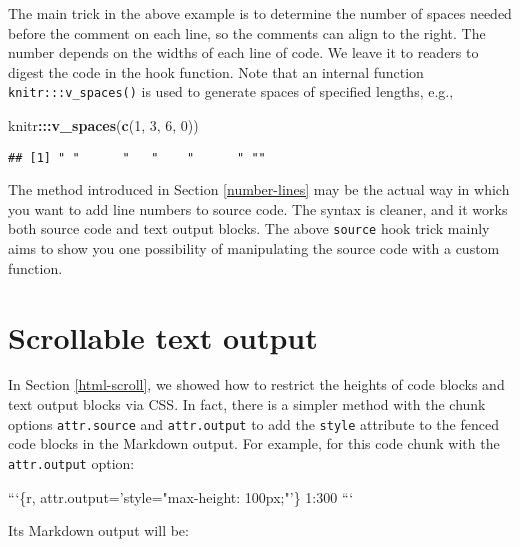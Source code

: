 \documentclass[
  11pt,
]{krantz}
\newenvironment{Shaded}{\begin{snugshade}}{\end{snugshade}}
\newcommand{\BaseNTok}[1]{\textcolor[rgb]{0.06,0.06,0.06}{#1}}
\newcommand{\DecValTok}[1]{\textcolor[rgb]{0.06,0.06,0.06}{#1}}
\newcommand{\KeywordTok}[1]{\textcolor[rgb]{0.27,0.27,0.27}{\textbf{#1}}}
\newcommand{\NormalTok}[1]{#1}
\newcommand{\OperatorTok}[1]{\textcolor[rgb]{0.43,0.43,0.43}{\textbf{#1}}}
\begin{document}
The main trick in the above example is to determine the number of spaces needed before the comment on each line, so the comments can align to the right. The number depends on the widths of each line of code. We leave it to readers to digest the code in the hook function. Note that an internal function \texttt{knitr:::v\_spaces()} is used to generate spaces of specified lengths, e.g.,

\begin{Shaded}
\begin{Highlighting}[]
\NormalTok{knitr}\OperatorTok{:::}\KeywordTok{v_spaces}\NormalTok{(}\KeywordTok{c}\NormalTok{(}\DecValTok{1}\NormalTok{, }\DecValTok{3}\NormalTok{, }\DecValTok{6}\NormalTok{, }\DecValTok{0}\NormalTok{))}
\end{Highlighting}
\end{Shaded}

\begin{verbatim}
## [1] " "      "   "    "      " ""
\end{verbatim}

The method introduced in Section \ref{number-lines} may be the actual way in which you want to add line numbers to source code. The syntax is cleaner, and it works both source code and text output blocks. The above \texttt{source} hook trick mainly aims to show you one possibility of manipulating the source code with a custom function.

\hypertarget{hook-scroll}{%
\section{Scrollable text output}\label{hook-scroll}}

In Section \ref{html-scroll}, we showed how to restrict the heights of code blocks and text output blocks via CSS. In fact, there is a simpler method with the chunk options \texttt{attr.source} and \texttt{attr.output} to add the \texttt{style} attribute to the fenced code blocks in the Markdown output. For example, for this code chunk with the \texttt{attr.output} option:

\begin{Shaded}
\begin{Highlighting}[]
\BaseNTok{```\{r, attr.output='style="max-height: 100px;"'\}}
\BaseNTok{1:300}
\BaseNTok{```}
\end{Highlighting}
\end{Shaded}

Its Markdown output will be:
\end{document}
